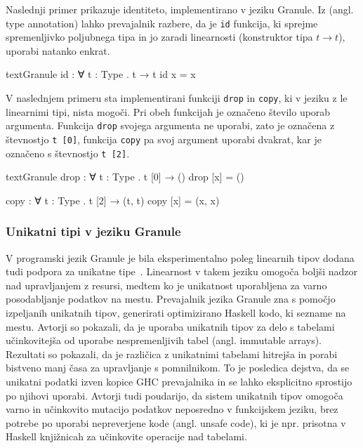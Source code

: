 Naslednji primer prikazuje identiteto, implementirano v jeziku Granule. Iz  (angl. type annotation) lahko prevajalnik razbere, da je \texttt{id} funkcija, ki sprejme spremenljivko poljubnega tipa in jo zaradi linearnosti (konstruktor tipa $t \to t$), uporabi natanko enkrat.

\begin{code-box}{text}{Granule}
id : ∀ {t : Type} . t → t
id x = x
\end{code-box}

V naslednjem primeru sta implementirani funkciji \texttt{drop} in \texttt{copy}, ki v jeziku z le linearnimi tipi, nista mogoči. Pri obeh funkcijah je označeno število uporab argumenta. Funkcija \texttt{drop} svojega argumenta ne uporabi, zato je označena z števnostjo \texttt{t [0]}, funkcija \texttt{copy} pa svoj argument uporabi dvakrat, kar je označeno s števnostjo \texttt{t [2]}.

\begin{code-box}{text}{Granule}
drop : ∀ {t : Type} . t [0] → ()
drop [x] = ()

copy : ∀ {t : Type} . t [2] → (t, t)
copy [x] = (x, x)
\end{code-box}

\subsubsection{Unikatni tipi v jeziku Granule}
V programski jezik Granule je bila eksperimentalno poleg linearnih tipov dodana tudi podpora za unikatne tipe~\cite{marshall2022linearity}. Linearnost v takem jeziku omogoča boljši nadzor nad upravljanjem z resursi, medtem ko je unikatnost uporabljena za varno posodabljanje podatkov na mestu. Prevajalnik jezika Granule zna s pomočjo izpeljanih unikatnih tipov, generirati optimizirano Haskell kodo, ki  sezname na mestu. Avtorji so pokazali, da je uporaba unikatnih tipov za delo s tabelami učinkovitejša od uporabe nespremenljivih tabel (angl. immutable arrays). Rezultati so pokazali, da je različica z unikatnimi tabelami hitrejša in porabi bistveno manj časa za upravljanje s pomnilnikom. To je posledica dejstva, da se unikatni podatki  izven kopice GHC prevajalnika in se lahko eksplicitno sprostijo po njihovi uporabi. Avtorji tudi poudarijo, da sistem unikatnih tipov omogoča varno in učinkovito mutacijo podatkov neposredno v funkcijskem jeziku, brez potrebe po uporabi nepreverjene kode (angl. unsafe code), ki je npr. prisotna v Haskell knjižnicah za učinkovite operacije nad tabelami.


